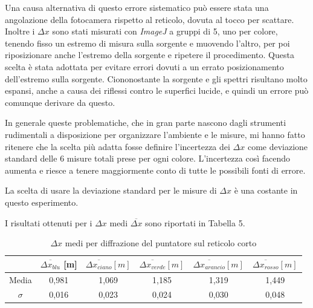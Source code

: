 \documentclass{article}
\begin{document}
\vspace{3mm}

Una causa alternativa di questo errore sistematico può essere stata una angolazione della fotocamera rispetto al reticolo, dovuta al tocco per scattare. Inoltre i $\Delta x$ sono stati misurati con \textit{ImageJ} a gruppi di 5, uno per colore, tenendo fisso un estremo di misura sulla sorgente e muovendo l'altro, per poi riposizionare anche l'estremo della sorgente e ripetere il procedimento. Questa scelta è stata adottata per evitare errori dovuti a un errato posizionamento dell'estremo sulla sorgente. Ciononostante la sorgente e gli spettri risultano molto espansi, anche a causa dei riflessi contro le superfici lucide, e quindi un errore può comunque derivare da questo.

\vspace{3mm}

In generale queste problematiche, che in gran parte nascono dagli strumenti rudimentali a disposizione per organizzare l'ambiente e le misure, mi hanno fatto ritenere che la scelta più adatta fosse definire l'incertezza dei $\Delta x$ come deviazione standard delle 6 misure totali prese per ogni colore. L'incertezza così facendo aumenta e riesce a tenere maggiormente conto di tutte le possibili fonti di errore.

\vspace{3mm}

La scelta di usare la deviazione standard per le misure di $\Delta x$ è una costante in questo esperimento.

\vspace{3mm}

I risultati ottenuti per i $\Delta x$  medi $\overline{\Delta x}$ sono riportati in Tabella 5.

\begin{table}[h]
    \centering
\begin{tabular}{||c|c|c|c|c|c||}
    \hline
     & \cellcolor{blue}$\overline{\Delta x_{blu}}$ [m] & \cellcolor{cyan}$\overline{\Delta x_{ciano}} [m]$ & \cellcolor{green}$\overline{\Delta x_{verde}}[m]$ & \cellcolor{orange}$\overline{\Delta x_{arancio}}[m]$ & \cellcolor{red}$\overline{\Delta x_{rosso}}[m]$ \\
    \hline
    Media & 0,981 & 1,069 & 1,185 & 1,319 & 1,449 \\
    $\sigma$ & 0,016 & 0,023 & 0,024 & 0,030 & 0,048\\
    \hline
\end{tabular}
\caption{$\Delta x$ medi per diffrazione del puntatore sul reticolo corto}
\end{table}
\end{document}
